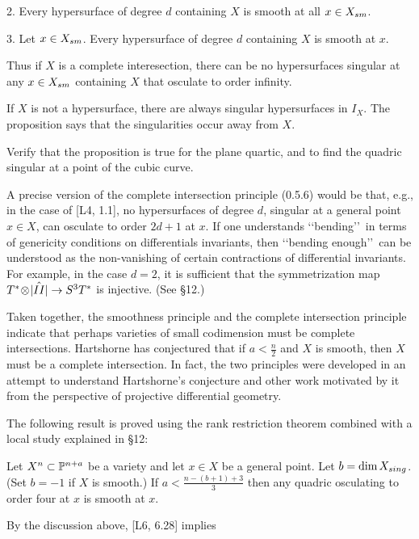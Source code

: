 2. Every hypersurface of degree $d$ containing $X$ is smooth at all
$x\in X_{sm}$.

3.  Let $x\in X_{sm}$. Every
 hypersurface of degree $d$ containing $X$ is smooth at $x$.\endproclaim

Thus if $X$ is a complete interesection,
there can be no hypersurfaces
singular at any $x\in X_{sm}$
containing
$X$ that osculate to order infinity.

If $X$ is not a hypersurface, there are always singular hypersurfaces
in $I_X$. The proposition says that the singularities occur away from
$X$.



 Verify   that the proposition
is true for the plane quartic, and to find the   quadric singular
at a point of the cubic curve.

\smallpagebreak

A precise version of
the complete intersection principle (0.5.6)
would be  that,
e.g., in the case of [L4, 1.1],
 no hypersurfaces of
degree $d$, singular at a general point $x\in X$, can osculate
to order $2d+1$ at $x$. If one understands \lq\lq bending\rq\rq\
in terms of genericity
conditions on differentials invariants, then
\lq\lq bending enough\rq\rq\ can be understood as the non-vanishing
of certain contractions
of differential invariants.
For example, in the case $d=2$,
it is sufficient that the   symmetrization map
$T^*\!\otimes\! \hat{| II |}\rightarrow S^3T^*$ is injective. (See \S 12.)

 
 

Taken together,  the smoothness principle and the complete
intersection principle indicate  that perhaps
varieties of small codimension   must be complete intersections.
Hartshorne has conjectured that if $a<\frac n2$ and $X$ is
smooth, then $X$ must be a  complete intersection. 
In fact, the two principles
were
 developed in an attempt to understand Hartshorne's conjecture
and other work motivated  by it
from the perspective of projective differential geometry. 


The following result is proved using the rank restriction
theorem combined with a local study explained in \S 12:

Let  $X^n\subset\Bbb P^{n+a}$ be a variety and let 
 $x\in X$ be a general point.
  Let $b=\text{dim}\, X_{sing}$. (Set $b=-1$ if $X$ is smooth.)
If
$a<\frac{n-(b+1)+3}{3}
$
then any quadric osculating to order four at $x$ is smooth at $x$.
\endproclaim

By the discussion above, [L6, 6.28] implies


